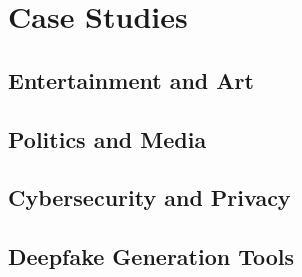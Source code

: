 
\chapter{Case Studies}\label{chapter:applications}

\section{Entertainment and Art}\label{chapter:art}
\section{Politics and Media}\label{chapter:media}
\section{Cybersecurity and Privacy}\label{chapter:cybersecurity}
\section{Deepfake Generation Tools}\label{chapter:generation}
